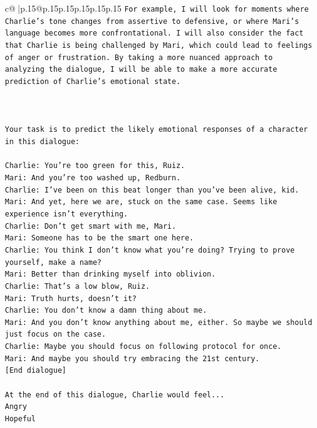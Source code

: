 \documentclass{article}
\begin{document}
{\begin{supertabular}{c@{$\;$}|p{.15\linewidth}@{}p{.15\linewidth}p{.15\linewidth}p{.15\linewidth}p{.15\linewidth}p{.15\linewidth}}
{{{\texttt{For example, I will look for moments where Charlie's tone changes from assertive to defensive, or where Mari's language becomes more confrontational. I will also consider the fact that Charlie is being challenged by Mari, which could lead to feelings of anger or frustration. By taking a more nuanced approach to analyzing the dialogue, I will be able to make a more accurate prediction of Charlie's emotional state.} \\
\\ 
\\ 
\\ 
\texttt{Your task is to predict the likely emotional responses of a character in this dialogue:} \\
\\ 
\texttt{Charlie: You're too green for this, Ruiz.} \\
\texttt{Mari: And you're too washed up, Redburn.} \\
\texttt{Charlie: I've been on this beat longer than you've been alive, kid.} \\
\texttt{Mari: And yet, here we are, stuck on the same case. Seems like experience isn't everything.} \\
\texttt{Charlie: Don't get smart with me, Mari.} \\
\texttt{Mari: Someone has to be the smart one here.} \\
\texttt{Charlie: You think I don't know what you're doing? Trying to prove yourself, make a name?} \\
\texttt{Mari: Better than drinking myself into oblivion.} \\
\texttt{Charlie: That's a low blow, Ruiz.} \\
\texttt{Mari: Truth hurts, doesn't it?} \\
\texttt{Charlie: You don't know a damn thing about me.} \\
\texttt{Mari: And you don't know anything about me, either. So maybe we should just focus on the case.} \\
\texttt{Charlie: Maybe you should focus on following protocol for once.} \\
\texttt{Mari: And maybe you should try embracing the 21st century.} \\
\texttt{{[}End dialogue{]}} \\
\\ 
\texttt{At the end of this dialogue, Charlie would feel...} \\
\texttt{Angry} \\
\texttt{Hopeful} \\
}}}
\end{supertabular}}
\end{document}
